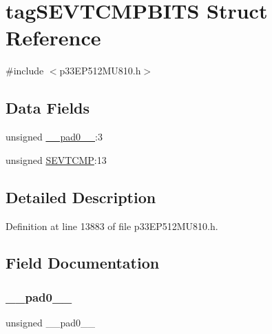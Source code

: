 \hypertarget{structtag_s_e_v_t_c_m_p_b_i_t_s}{}\section{tag\+S\+E\+V\+T\+C\+M\+P\+B\+I\+TS Struct Reference}
\label{structtag_s_e_v_t_c_m_p_b_i_t_s}


{\ttfamily \#include $<$p33\+E\+P512\+M\+U810.\+h$>$}

\subsection*{Data Fields}
\begin{DoxyCompactItemize}
\item 
unsigned \hyperlink{structtag_s_e_v_t_c_m_p_b_i_t_s_adf71f3d8410c1f1dbbc96680a92c49af}{\+\_\+\+\_\+pad0\+\_\+\+\_\+}\+:3
\item 
unsigned \hyperlink{structtag_s_e_v_t_c_m_p_b_i_t_s_ab4b5aa9011f46cebf292d1eb68b5dd4d}{S\+E\+V\+T\+C\+MP}\+:13
\end{DoxyCompactItemize}


\subsection{Detailed Description}


Definition at line 13883 of file p33\+E\+P512\+M\+U810.\+h.



\subsection{Field Documentation}
\mbox{\label{structtag_s_e_v_t_c_m_p_b_i_t_s_adf71f3d8410c1f1dbbc96680a92c49af}} 
\subsubsection{\texorpdfstring{\+\_\+\+\_\+pad0\+\_\+\+\_\+}{\_\_pad0\_\_}}
{\footnotesize\ttfamily unsigned \+\_\+\+\_\+pad0\+\_\+\+\_\+}



